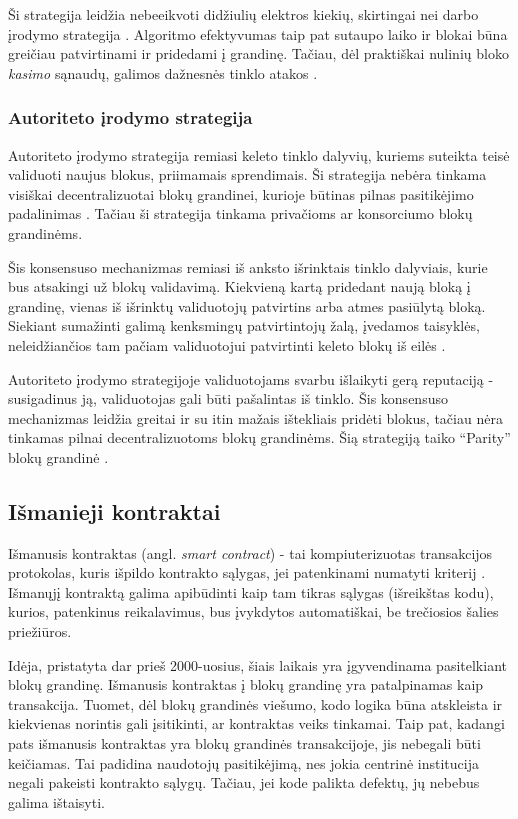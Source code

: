 Ši strategija leidžia nebeeikvoti didžiulių elektros kiekių, skirtingai nei darbo įrodymo strategija \cite{Ethereum}. Algoritmo efektyvumas
taip pat sutaupo laiko ir blokai būna greičiau patvirtinami ir pridedami į grandinę. Tačiau, dėl praktiškai nulinių bloko \textit{kasimo} sąnaudų,
galimos dažnesnės tinklo atakos \cite{Zheng2017}. 

\subsubsection{Autoriteto įrodymo strategija}

Autoriteto įrodymo strategija remiasi keleto tinklo dalyvių, kuriems suteikta teisė validuoti naujus blokus, priimamais sprendimais. Ši strategija nebėra tinkama visiškai
decentralizuotai blokų grandinei, kurioje būtinas pilnas pasitikėjimo padalinimas \cite{ProofOfAuthority}. Tačiau ši strategija tinkama privačioms
ar konsorciumo blokų grandinėms.

Šis konsensuso mechanizmas remiasi iš anksto išrinktais tinklo dalyviais, kurie bus atsakingi už blokų validavimą. Kiekvieną kartą pridedant naują
bloką į grandinę, vienas iš išrinktų validuotojų patvirtins arba atmes pasiūlytą bloką. Siekiant sumažinti galimą kenksmingų patvirtintojų žalą,
įvedamos taisyklės, neleidžiančios tam pačiam validuotojui patvirtinti keleto blokų iš eilės \cite{ProofOfAuthority}.

Autoriteto įrodymo strategijoje validuotojams svarbu išlaikyti gerą reputaciją - susigadinus ją, validuotojas gali būti pašalintas iš tinklo. Šis konsensuso mechanizmas
leidžia greitai ir su itin mažais ištekliais pridėti blokus, tačiau nėra tinkamas pilnai decentralizuotoms blokų grandinėms. Šią strategiją
taiko \enquote{Parity} blokų grandinė \cite{ProofOfAuthority}.

\subsection{Išmanieji kontraktai}

Išmanusis kontraktas (angl. \textit{smart contract}) - tai kompiuterizuotas transakcijos protokolas, kuris
išpildo kontrakto sąlygas, jei patenkinami numatyti kriterij \cite{Szabo1997}.
Išmanųjį kontraktą galima apibūdinti kaip tam tikras sąlygas (išreikštas kodu), kurios, patenkinus reikalavimus, bus įvykdytos automatiškai,
be trečiosios šalies priežiūros.

Idėja, pristatyta dar prieš 2000-uosius, šiais laikais yra įgyvendinama pasitelkiant blokų grandinę. Išmanusis kontraktas
į blokų grandinę yra patalpinamas kaip transakcija. Tuomet, dėl blokų grandinės viešumo, kodo logika būna atskleista ir kiekvienas norintis
gali įsitikinti, ar kontraktas veiks tinkamai. Taip pat, kadangi pats išmanusis kontraktas yra blokų grandinės transakcijoje, jis nebegali būti keičiamas.
Tai padidina naudotojų pasitikėjimą, nes jokia centrinė institucija negali
pakeisti kontrakto sąlygų. Tačiau, jei kode palikta defektų, jų nebebus galima ištaisyti.

